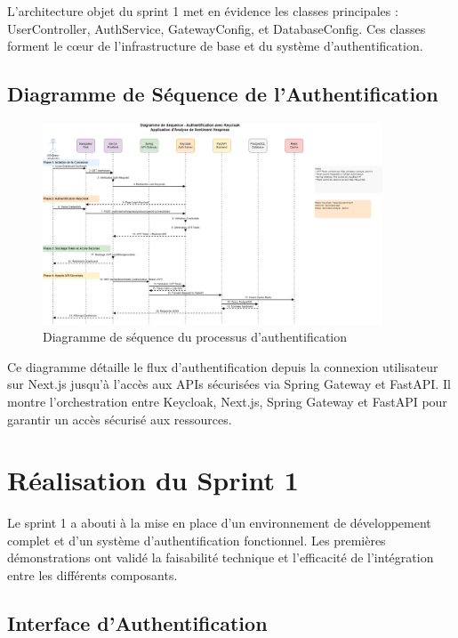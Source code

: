 L'architecture objet du sprint 1 met en évidence les classes principales : UserController, AuthService, GatewayConfig, et DatabaseConfig. Ces classes forment le cœur de l'infrastructure de base et du système d'authentification.

\subsection{Diagramme de Séquence de l'Authentification}

\begin{figure}[H]
\centering
\includegraphics[width=0.9\textwidth]{assets/images/sprint1-sequence.png}
\caption{Diagramme de séquence du processus d'authentification}
\label{fig:sprint1-sequence}
\end{figure}

Ce diagramme détaille le flux d'authentification depuis la connexion utilisateur sur Next.js jusqu'à l'accès aux APIs sécurisées via Spring Gateway et FastAPI. Il montre l'orchestration entre Keycloak, Next.js, Spring Gateway et FastAPI pour garantir un accès sécurisé aux ressources.

\section{Réalisation du Sprint 1}

Le sprint 1 a abouti à la mise en place d'un environnement de développement complet et d'un système d'authentification fonctionnel. Les premières démonstrations ont validé la faisabilité technique et l'efficacité de l'intégration entre les différents composants.

\subsection{Interface d'Authentification}

